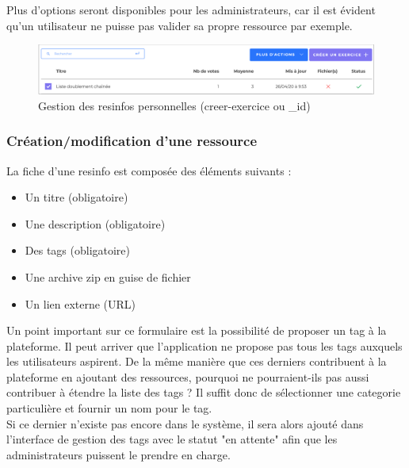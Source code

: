Plus d'options seront disponibles pour les administrateurs, car il est évident qu'un utilisateur ne puisse pas valider sa propre ressource par exemple.

\begin{figure}[H]
    \includegraphics[width=\textwidth,height=\textheight,keepaspectratio]{images/client/gestion-options.png}
    \caption[SourceCode : créer une \gls{resinfo}]{Gestion des \glspl{resinfo} personnelles (creer-exercice ou \_id)}
    \centering
\end{figure}

\subsubsection{Création/modification d'une ressource}

La fiche d'une \gls{resinfo} est composée des éléments suivants :

\begin{itemize}
    \item Un titre (obligatoire)
    \item Une description (obligatoire)
    \item Des \glspl{tag} (obligatoire)
    \item Une archive zip en guise de fichier
    \item Un lien externe (URL)
\end{itemize}

Un point important sur ce formulaire est la possibilité de proposer un \gls{tag} à la plateforme. Il peut arriver que l'application ne propose pas tous les \glspl{tag} auxquels les utilisateurs aspirent. De la même manière que ces derniers contribuent à la plateforme en ajoutant des ressources, pourquoi ne pourraient-ils pas aussi contribuer à étendre la liste des \glspl{tag} ? Il suffit donc de sélectionner une categorie particulière et fournir un nom pour le \gls{tag}.\\

Si ce dernier n'existe pas encore dans le système, il sera alors ajouté dans l'interface de gestion des \glspl{tag} avec le statut "en attente" afin que les administrateurs puissent le prendre en charge.

